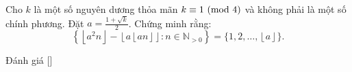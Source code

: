 \ifshowproblem
\begin{problem}\label{problem:ROU-2015-TST-D1-P4}
    Cho \( k \) là một số nguyên dương thỏa mãn \( k \equiv 1 \ (\mathrm{mod}\ 4) \) và không phải là một số chính phương. 
    Đặt \( a = \frac{1 + \sqrt{k}}{2} \).  
    Chứng minh rằng:
    \[
        \left\{ \left\lfloor a^2n \right\rfloor - \left\lfloor a\left\lfloor an \right\rfloor \right\rfloor : n \in \mathbb{N}_{>0} \right\} = \{1, 2, \ldots, \left\lfloor a \right\rfloor\}.
    \]
\end{problem}
\fi

\ifshowinfo
Đánh giá [\textbf{}]\footnotemark
{}
\fi